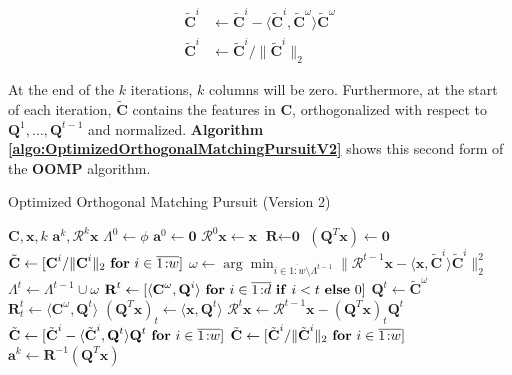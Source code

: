 \documentclass[12pt,a4paper,oneside,english]{UPBThesis}
\newcommand{\hcrange}[2]{\overline{{#1}\colon\!\!{#2}}}
\begin{document}
\begin{align*}
\tilde{\textbf{C}}^i & \gets \tilde{\textbf{C}}^i - \langle \tilde{\textbf{C}}^i, \tilde{\textbf{C}}^\omega \rangle \tilde{\textbf{C}}^\omega \\
\tilde{\textbf{C}}^i & \gets \tilde{\textbf{C}}^i / \| \tilde{\textbf{C}}^i \|_2
\end{align*}

At the end of the $k$ iterations, $k$ columns will be zero. Furthermore, at the start of each iteration, $\tilde{\textbf{C}}$ contains the features in $\textbf{C}$, orthogonalized with respect to $\textbf{Q}^1, \dots, \textbf{Q}^{t-1}$ and normalized. \textbf{Algorithm \ref{algo:OptimizedOrthogonalMatchingPursuitV2}} shows this second form of the \textbf{OOMP} algorithm.

\begin{algorithm}
\caption{Optimized Orthogonal Matching Pursuit (Version 2)}
\label{algo:OptimizedOrthogonalMatchingPursuitV2}
\begin{algorithmic}
\Require $\textbf{C},\textbf{x},k$
\Ensure $\textbf{a}^k,\mathcal{R}^k\textbf{x}$
\State $\Lambda^0 \gets \phi$
\State $\textbf{a}^0 \gets \textbf{0}$
\State $\mathcal{R}^0\textbf{x} \gets \textbf{x}$
\State $\textbf{R} \gets \textbf{0}$
\State $(\textbf{Q}^T\textbf{x}) \gets \textbf{0}$
\State $\tilde{\textbf{C}} \gets [ \textbf{C}^i / \|\textbf{C}^i\|_2 ~ \mbox{\textbf{for} $i \in \hcrange{1}{w}$} ]$
\For {$t = \hcrange{1}{k}$}
\State $\omega \gets \arg\min_{i \in \hcrange{1}{w} \setminus \Lambda^{t-1}} \| \mathcal{R}^{t-1}\textbf{x} - \langle \textbf{x}, \tilde{\textbf{C}}^i \rangle \tilde{\textbf{C}}^i \|_2^2$  
\State $\Lambda^t \gets \Lambda^{t-1} \cup \omega$
\State $\textbf{R}^t \gets [ \langle \textbf{C}^\omega, \textbf{Q}^i \rangle~\mbox{\textbf{for} $i \in \hcrange{1}{d}$ \textbf{if} $i < t$ \textbf{else} $0$} ]$ 
\State $\textbf{Q}^t \gets \tilde{\textbf{C}}^\omega$
\State $\textbf{R}^t_t \gets \langle \textbf{C}^\omega, \textbf{Q}^t \rangle$
\State $(\textbf{Q}^T\textbf{x})_t \gets \langle \textbf{x}, \textbf{Q}^t \rangle$
\State $\mathcal{R}^t\textbf{x} \gets \mathcal{R}^{t-1}\textbf{x} -  (\textbf{Q}^T\textbf{x})_t \textbf{Q}^t$
\State $\tilde{\textbf{C}} \gets [ \tilde{\textbf{C}}^i - \langle \tilde{\textbf{C}}^i, \textbf{Q}^t \rangle \textbf{Q}^t ~ \mbox{\textbf{for} $i \in \hcrange{1}{w}$} ]$
\State $\tilde{\textbf{C}} \gets [ \tilde{\textbf{C}}^i / \| \tilde{\textbf{C}}^i \|_2 ~ \mbox{\textbf{for} $i \in \hcrange{1}{w}$} ]$
\EndFor
\State $\textbf{a}^k \gets \textbf{R}^{-1}(\textbf{Q}^T\textbf{x})$
\end{algorithmic}
\end{algorithm}
\end{document}
